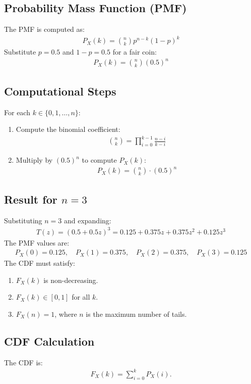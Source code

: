 \documentclass[journal]{IEEEtran}
\begin{document}
\subsection*{Probability Mass Function (PMF)}
The PMF is computed as:
\begin{align}
P_X(k) = \binom{n}{k} p^{n-k} (1-p)^k
\end{align}
Substitute \(p = 0.5\) and \(1-p = 0.5\) for a fair coin:
\begin{align}
P_X(k) = \binom{n}{k} (0.5)^n
\end{align}

\subsection*{Computational Steps}
For each \(k \in \{0, 1, \dots, n\}\):
\begin{enumerate}
    \item Compute the binomial coefficient:
    \begin{align}
    \binom{n}{k} = \prod_{i=0}^{k-1} \frac{n-i}{k-i}
    \end{align}
    \item Multiply by \((0.5)^n\) to compute \(P_X(k)\):
    \begin{align}
    P_X(k) = \binom{n}{k} \cdot (0.5)^n
    \end{align}
\end{enumerate}

\subsection*{Result for \(n = 3\)}
Substituting \(n = 3\) and expanding:
\begin{align}
T(z) = (0.5 + 0.5z)^3 = 0.125 + 0.375z + 0.375z^2 + 0.125z^3
\end{align}
The PMF values are:
\begin{align}
P_X(0) = 0.125, \quad P_X(1) = 0.375, \quad P_X(2) = 0.375, \quad P_X(3) = 0.125
\end{align}
The CDF must satisfy:
\begin{enumerate}
    \item \(F_X(k)\) is non-decreasing.
    \item \(F_X(k) \in [0, 1]\) for all \(k\).
    \item \(F_X(n) = 1\), where \(n\) is the maximum number of tails.
\end{enumerate}
\subsection*{CDF Calculation}
The CDF is:
\begin{align}
F_X(k) = \sum_{i=0}^{k} P_X(i).
\end{align}
\end{document}
